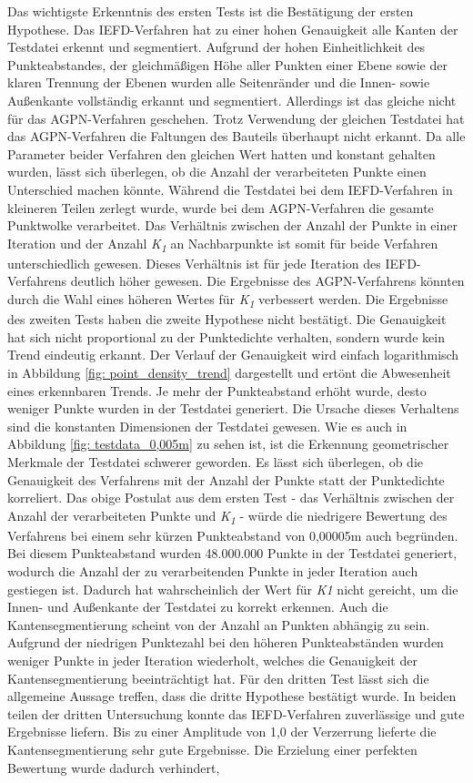 Das wichtigste Erkenntnis des ersten Tests ist die Bestätigung der ersten Hypothese. Das IEFD-Verfahren hat zu einer hohen Genauigkeit alle Kanten der Testdatei erkennt und segmentiert. Aufgrund der hohen Einheitlichkeit des Punkteabstandes, der gleichmäßigen Höhe aller Punkten einer Ebene sowie der klaren Trennung der Ebenen wurden alle Seitenränder und die Innen- sowie Außenkante vollständig erkannt und segmentiert. Allerdings ist das gleiche nicht für das AGPN-Verfahren geschehen. Trotz Verwendung der gleichen Testdatei hat das AGPN-Verfahren die Faltungen des Bauteils überhaupt nicht erkannt. Da alle Parameter beider Verfahren den gleichen Wert hatten und konstant gehalten wurden, lässt sich überlegen, ob die Anzahl der verarbeiteten Punkte einen Unterschied machen könnte. Während die Testdatei bei dem IEFD-Verfahren in kleineren Teilen zerlegt wurde, wurde bei dem AGPN-Verfahren die gesamte Punktwolke verarbeitet. Das Verhältnis zwischen der Anzahl der Punkte in einer Iteration und der Anzahl \textit{K\textsubscript{1}} an Nachbarpunkte ist somit für beide Verfahren unterschiedlich gewesen. Dieses Verhältnis ist für jede Iteration des IEFD-Verfahrens deutlich höher gewesen. Die Ergebnisse des AGPN-Verfahrens könnten durch die Wahl eines höheren Wertes für \textit{K\textsubscript{1}} verbessert werden. Die Ergebnisse des zweiten Tests haben die zweite Hypothese nicht bestätigt. Die Genauigkeit hat sich nicht proportional zu der Punktedichte verhalten, sondern wurde kein Trend eindeutig erkannt. Der Verlauf der Genauigkeit wird einfach logarithmisch in Abbildung \ref{fig: point_density_trend} dargestellt und ertönt die Abwesenheit eines erkennbaren Trends. Je mehr der Punkteabstand erhöht wurde, desto weniger Punkte wurden in der Testdatei generiert. Die Ursache dieses Verhaltens sind die konstanten Dimensionen der Testdatei gewesen. Wie es auch in Abbildung \ref{fig: testdata_0,005m} zu sehen ist, ist die Erkennung geometrischer Merkmale der Testdatei schwerer geworden. Es lässt sich überlegen, ob die Genauigkeit des Verfahrens mit der Anzahl der Punkte statt der Punktedichte korreliert. Das obige Postulat aus dem ersten Test - das Verhältnis zwischen der Anzahl der verarbeiteten Punkte und \textit{K\textsubscript{1}} - würde die niedrigere Bewertung des Verfahrens bei einem sehr kürzen Punkteabstand von 0,00005m auch begründen. Bei diesem Punkteabstand wurden 48.000.000 Punkte in der Testdatei generiert, wodurch die Anzahl der zu verarbeitenden Punkte in jeder Iteration auch gestiegen ist. Dadurch hat wahrscheinlich der Wert für \textit{K\textit{1}} nicht gereicht, um die Innen- und Außenkante der Testdatei zu korrekt erkennen. Auch die Kantensegmentierung scheint von der Anzahl an Punkten abhängig zu sein. Aufgrund der niedrigen Punktezahl bei den höheren Punkteabständen wurden weniger Punkte in jeder Iteration wiederholt, welches die Genauigkeit der Kantensegmentierung beeinträchtigt hat. Für den dritten Test lässt sich die allgemeine Aussage treffen, dass die dritte Hypothese bestätigt wurde. In beiden teilen der dritten Untersuchung konnte das IEFD-Verfahren zuverlässige und gute Ergebnisse liefern. Bis zu einer Amplitude von 1,0 der Verzerrung lieferte die Kantensegmentierung sehr gute Ergebnisse. Die Erzielung einer perfekten Bewertung wurde dadurch verhindert, 
